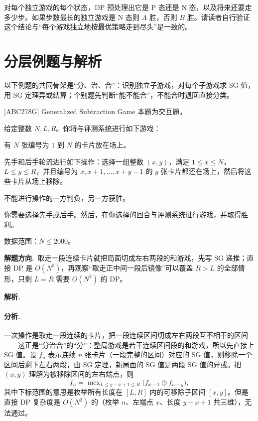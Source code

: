 \documentclass[UTF8,a4paper,11pt,oneside,openany,fontset=fandol]{ctexbook}
\theoremstyle{definition}
\newcommand{\mex}{\operatorname{mex}}
\newcommand{\sol}{\par\noindent\textbf{解析.}\ }
\newcommand{\hint}{\par\noindent\textbf{解题方向.}\ }
\begin{document}
对每个独立游戏的每个状态，DP 预处理出它是 P 态还是 N 态，以及将来还要走多少步。如果步数最长的独立游戏是 N 态则 $A$ 胜，否则 $B$ 胜。请读者自行验证这个结论与“每个游戏独立地按最优策略走到尽头”是一致的。

\section{分层例题与解析}

以下例题的共同骨架是“分、治、合”：识别独立子游戏，对每个子游戏求 SG 值，用 SG 定理异或结算；个别题先判断“能不能合”，不能合时退回直接分类。

\begin{problem}{[ABC278G] Generalized Subtraction Game}
本题为交互题。

给定整数 $N,L,R$。你将与评测系统进行如下游戏：

有 $N$ 张编号为 $1$ 到 $N$ 的卡片放在场上。

先手和后手轮流进行如下操作：选择一组整数 $(x,y)$，满足 $1\le x\le N$，$L\le y\le R$，并且编号为 $x,x+1,\ldots,x+y-1$ 的 $y$ 张卡片都还在场上，然后将这些卡片从场上移除。

不能进行操作的一方判负，另一方获胜。

你需要选择先手或后手。然后，在你选择的回合与评测系统进行游戏，并取得胜利。

数据范围：$N\le2000$。
\end{problem}

\hint 取走一段连续卡片就把局面切成左右两段的和游戏，先写 SG 递推；直接 DP 是 $O(N^3)$，再观察“取走正中间一段后镜像”可以覆盖 $R>L$ 的全部情形，只剩 $L=R$ 需要 $O(N^2)$ 的 DP。

\sol \paragraph{分析.} 一次操作是取走一段连续的卡片，把一段连续区间切成左右两段互不相干的区间——这正是“分治合”的“分”：整局游戏是若干连续区间段的和游戏，所以先直接上 SG 值。设 $f_n$ 表示连续 $n$ 张卡片（一段完整的区间）对应的 SG 值，则移除一个区间后剩下左右两段，由 SG 定理，新局面的 SG 值是两段 SG 值的异或。把 $(x,y)$ 理解为被移除区间的左右端点，则
\[
 f_n=\mex_{L\le y-x+1\le R}\bigl(f_{x-1}\oplus f_{n-y}\bigr),
\]
其中下标范围的意思是枚举所有长度在 $[L,R]$ 内的可移除子区间 $[x,y]$。但是直接 DP 复杂度是 $O(N^{3})$ 的（枚举 $n$、左端点 $x$、长度 $y-x+1$ 共三维），无法通过。
\end{document}
